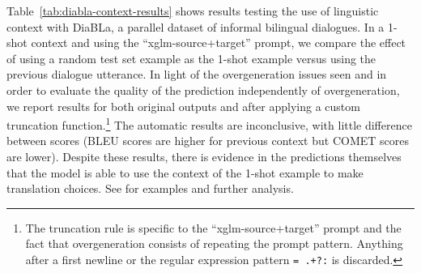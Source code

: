 \documentclass[twoside,11pt]{article}
\begin{document}
Table~\ref{tab:diabla-context-results} shows results testing the use of linguistic context with DiaBLa, a parallel dataset of informal bilingual dialogues. In a 1-shot context and using the ``xglm-source+target'' prompt, we compare the effect of using a random test set example as the 1-shot example versus using the previous dialogue utterance. In light of the overgeneration issues seen and in order to evaluate the quality of the prediction independently of overgeneration, we report results for both original outputs and after applying a custom truncation function.\footnote{The truncation rule is specific to the ``xglm-source+target'' prompt and the fact that overgeneration consists of repeating the prompt pattern. Anything after a first newline or the regular expression pattern \texttt{= .+?:} is discarded.} The automatic results are inconclusive, with little difference between scores (BLEU scores are higher for previous context but COMET scores are lower). Despite these results, there is evidence in the predictions themselves that the model is able to use the context of the 1-shot example to make translation choices. See \citep{bawden-yvon-2023-mt-bloom} for examples and further analysis.

\end{document}
